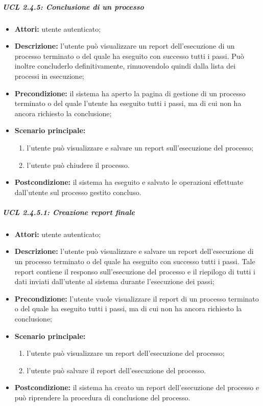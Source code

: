 \subparagraph{UCL 2.4.5: Conclusione di un processo}
\begin{itemize}
\item \textbf{Attori:} utente autenticato;
\item \textbf{Descrizione:} l'utente può visualizzare un report dell'esecuzione di un processo terminato o del quale ha eseguito con successo tutti i passi. Può inoltre concluderlo definitivamente, rimuovendolo quindi dalla lista dei processi in esecuzione;
\item \textbf{Precondizione:} il sistema ha aperto la pagina di gestione di un processo terminato o del quale l'utente ha eseguito tutti i passi, ma di cui non ha ancora richiesto la conclusione;
\item \textbf{Scenario principale:}
\begin{enumerate}
\item l'utente può visualizzare e salvare un report sull'esecuzione del processo;
\item l'utente può chiudere il processo.
\end{enumerate}
\item \textbf{Postcondizione:} il sistema ha eseguito e salvato le operazioni effettuate dall'utente sul processo gestito concluso.
\end{itemize}

\subparagraph{UCL 2.4.5.1: Creazione report finale}
\begin{itemize}
\item \textbf{Attori:} utente autenticato;
\item \textbf{Descrizione:} l'utente può visualizzare e salvare un report dell'esecuzione di un processo terminato o del quale ha eseguito con successo tutti i passi. Tale report contiene il responso sull'esecuzione del processo e il riepilogo di tutti i dati inviati dall'utente al sistema durante l'esecuzione dei passi;
\item \textbf{Precondizione:} l'utente vuole visualizzare il report di un processo terminato o del quale ha eseguito tutti i passi, ma di cui non ha ancora richiesto la conclusione;
\item \textbf{Scenario principale:}
\begin{enumerate}
\item l'utente può visualizzare un report dell'esecuzione del processo;
\item l'utente può salvare il report dell'esecuzione del processo.
\end{enumerate}
\item \textbf{Postcondizione:} il sistema ha creato un report dell'esecuzione del processo e può riprendere la procedura di conclusione del processo.
\end{itemize}

